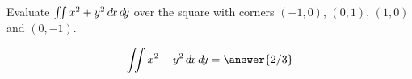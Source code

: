 \documentclass{ximera}
\author{David Guichard \and Neal Koblitz \and H. Jerome Keisler \and Albert Scheller \and Barry Balof \and Mike Wills \and Matthew Carr}
\begin{document}
\begin{exercise}




Evaluate $\iint x^2+y^2 \mathop{}\!d\! x \mathop{}\!d\! y$ over the square with corners $(-1,0)$, $(0,1)$, $(1,0)$ and $(0,-1)$.

\begin{prompt}
\[
\iint x^2+y^2 \d x \d y=\answer{2/3}
\]
\end{prompt}



\end{exercise}
\end{document}
